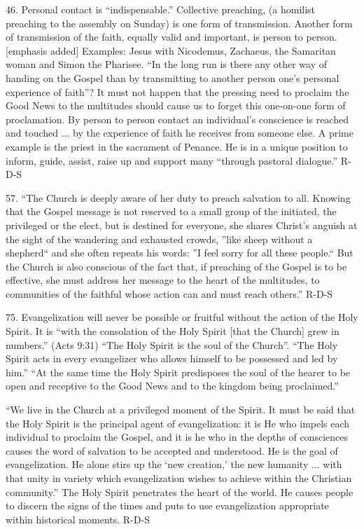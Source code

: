 \documentclass[oneside]{book}
\begin{document}
46. Personal contact is ``indispensable.'' Collective preaching, (a homilist
preaching to the assembly on Sunday) is one form of transmission. Another form
of transmission of the faith, equally valid and important, is person to
person. [emphasis added] Examples: Jesus with Nicodemus, Zachaeus, the Samaritan
woman and Simon the Pharisee. ``In the long run is there any other way of
handing on the Gospel than by transmitting to another person one's personal
experience of faith''? It must not happen that the pressing need to proclaim the
Good News to the multitudes should cause us to forget this one-on-one form of
proclamation. By person to person contact an individual's conscience is reached
and touched ... by the experience of faith he receives from someone else. A
prime example is the priest in the sacrament of Penance. He is in a unique
position to inform, guide, assist, raise up and support many ``through pastoral
dialogue.''
R-D-S

57. ``The Church is deeply aware of her duty to preach salvation to all. Knowing
that the Gospel message is not reserved to a small group of the initiated, the
privileged or the elect, but is destined for everyone, she shares Christ's
anguish at the sight of the wandering and exhausted crowds, ''like sheep without
a shepherd`` and she often repeats his words: ''I feel sorry for all these
people.`` But the Church is also conscious of the fact that, if preaching of the
Gospel is to be effective, she must address her message to the heart of the
multitudes, to communities of the faithful whose action can and must reach
others.''
R-D-S

75. Evangelization will never be possible or fruitful without the action of the
Holy Spirit. It is ``with the consolation of the Holy Spirit [that the Church]
grew in numbers.'' (Acts 9:31) ``The Holy Spirit is the soul of the
Church''. ``The Holy Spirit acts in every evangelizer who allows himself to be
possessed and led by him.'' ``At the same time the Holy Spirit predisposes the
soul of the hearer to be open and receptive to the Good News and to the kingdom
being proclaimed.''

``We live in the Church at a privileged moment of the Spirit. It must be said
that the Holy Spirit is the principal agent of evangelization: it is He who
impels each individual to proclaim the Gospel, and it is he who in the depths of
consciences causes the word of salvation to be accepted and understood. He is
the goal of evangelization. He alone stirs up the `new creation,' the new
humanity ... with that unity in variety which evangelization wishes to achieve
within the Christian community.'' The Holy Spirit penetrates the heart of the
world. He causes people to discern the signs of the times and puts to use
evangelization appropriate within historical moments.
R-D-S
\end{document}
